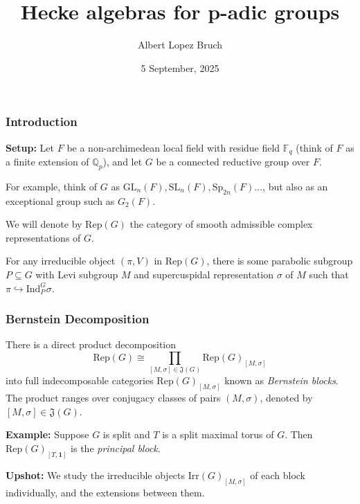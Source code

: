 \documentclass{beamer}
\title{Hecke algebras for p-adic groups}
\author{Albert Lopez Bruch}
\institute{London School of Geometry and Number Theory}
\date{5 September, 2025}
\newcommand{\Rep}{\mathrm{Rep}}
\newcommand{\Irr}{\mathrm{Irr}}
\newcommand{\Ind}{\mathrm{Ind}}
\newcommand{\GL}{\mathrm{GL}}
\newcommand{\SL}{\mathrm{SL}}
\newcommand{\Sp}{\mathrm{Sp}}
\newcommand{\QQ}{\mathbb{Q}}
\theoremstyle{plain}
\begin{document}
\frame{\titlepage}


\begin{frame}
    \frametitle{Introduction}
    \textbf{Setup:} Let $F$ be a non-archimedean local field with residue field $\mathbb{F}_q$ (think of $F$ as a finite extension of $\QQ_p$), and let $G$ be a connected reductive group over $F$.\pause
    \vspace{0.3cm}

    For example, think of $G$ as $\GL_n(F), \SL_n(F), \Sp_{2n}(F)\ldots$, but also as an exceptional group such as $G_2(F)$.\pause
    \vspace{0.3cm}

    We will denote by $\Rep(G)$ the category of smooth admissible complex representations of $G$.\pause

    \begin{fact}
        For any irreducible object $(\pi,V)$ in $\Rep(G)$, there is some parabolic subgroup $P\subseteq G$ with Levi subgroup $M$ and supercuspidal representation $\sigma$ of $M$ such that $\pi\hookrightarrow\Ind_P^G\sigma$.
    \end{fact}
\end{frame}

\begin{frame}
    \frametitle{Bernstein Decomposition}
    \begin{theorem}[Bernstein]
        There is a direct product decomposition
        \[\Rep(G)\cong \prod_{[M,\sigma]\in\mathfrak{J}(G)}\Rep(G)_{[M,\sigma]}\]
        into full indecomposable categories $\Rep(G)_{[M,\sigma]}$ known as \textit{Bernstein blocks}. \pause 
        The product ranges over conjugacy classes of pairs $(M,\sigma)$, denoted by $[M,\sigma]\in\mathfrak{J}(G)$.\pause
    \end{theorem}
    \textbf{Example:} Suppose $G$ is split and $T$ is a split maximal torus of $G$. Then $\Rep(G)_{[T,\mathbf{1}]}$ is the \textit{principal block}.\pause
    \vspace{0.3cm}
    
    \textbf{Upshot:} We study the irreducible objects $\Irr(G)_{[M,\sigma]}$ of each block individually, and the extensions between them.
\end{frame}
\end{document}
